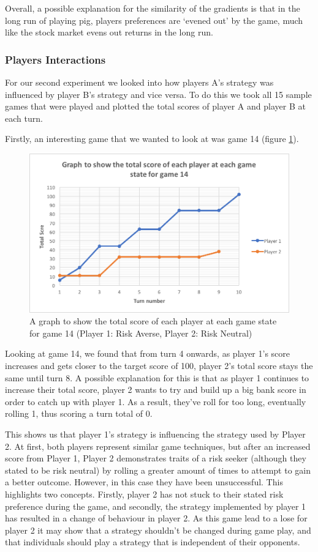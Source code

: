 \documentclass[a4paper,titlepage]{article}
\begin{document}
Overall, a possible explanation for the similarity of the gradients is that in the long run of playing pig, players preferences are ‘evened out’ by the game, much like the stock market evens out returns in the long run.
\subsubsection{Players Interactions}
For our second experiment we looked into how players A’s strategy was influenced by player B’s strategy and vice versa. To do this we took all 15 sample games that were played and plotted the total scores of player A and player B at each turn.

Firstly, an interesting game that we wanted to look at was game 14 (figure \ref{figure13}).


\begin{figure}
\includegraphics[scale=1]{game14}
\caption{A graph to show the total score of each player at each game state for game 14 (Player 1: Risk Averse, Player 2: Risk Neutral)\label{figure13}}
\end{figure}
Looking at game 14, we found that from turn 4 onwards, as player 1’s score increases and gets closer to the target score of 100, player 2’s total score stays the same until turn 8. A possible explanation for this is that as player 1 continues to increase their total score, player 2 wants to try and build up a big bank score in order to catch up with player 1. As a result, they’ve roll for too long, eventually rolling 1, thus scoring a turn total of 0.

This shows us that player 1’s strategy is influencing the strategy used by Player 2. At first, both players represent similar game techniques, but after an increased score from Player 1, Player 2 demonstrates traits of a risk seeker (although they stated to be risk neutral) by rolling a greater amount of times to attempt to gain a better outcome. However, in this case they have been unsuccessful. This highlights two concepts. Firstly, player 2 has not stuck to their stated risk preference during the game, and secondly, the strategy implemented by player 1 has resulted in a change of behaviour in player 2. As this game lead to a lose for player 2 it may show that a strategy shouldn’t be changed during game play, and that individuals should play a strategy that is independent of their opponents.
\end{document}
